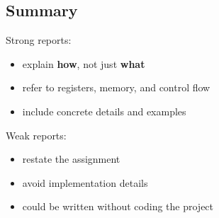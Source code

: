 \documentclass[a4paper,12pt]{article}
\begin{document}
\subsection*{Summary}

Strong reports:
\begin{itemize}
\item explain \textbf{how}, not just \textbf{what}
\item refer to registers, memory, and control flow
\item include concrete details and examples
\end{itemize}

Weak reports:
\begin{itemize}
\item restate the assignment
\item avoid implementation details
\item could be written without coding the project
\end{itemize}
\end{document}
